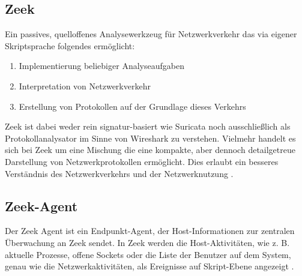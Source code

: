 \subsection{Zeek}
Ein passives, quelloffenes Analysewerkzeug für Netzwerkverkehr das via eigener  Skriptsprache folgendes ermöglicht:
\begin{enumerate}
\item{Implementierung beliebiger Analyseaufgaben}
\item{Interpretation von Netzwerkverkehr}
\item{Erstellung von Protokollen auf der Grundlage dieses Verkehrs}
\end{enumerate}
Zeek ist dabei weder rein signatur-basiert wie Suricata noch ausschließlich als Protokollanalysator im Sinne von Wireshark zu verstehen. Vielmehr handelt es sich bei Zeek um eine Mischung die eine kompakte, aber dennoch detailgetreue Darstellung von Netzwerkprotokollen ermöglicht. Dies erlaubt ein besseres Verständnis des Netzwerkverkehrs und der Netzwerknutzung \cite{zeek}.
\subsection{Zeek-Agent}
Der Zeek Agent ist ein Endpunkt-Agent, der Host-Informationen zur zentralen Überwachung an Zeek sendet. In Zeek werden die Host-Aktivitäten, wie z. B. aktuelle Prozesse, offene Sockets oder die Liste der Benutzer auf dem System, genau wie die Netzwerkaktivitäten, als Ereignisse auf Skript-Ebene angezeigt \cite{zeek-agent}.

